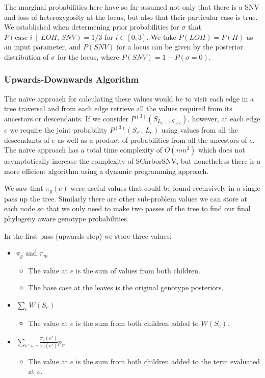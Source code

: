 \documentclass[../../main.tex]{subfiles}
\begin{document}
The marginal probabilities here have so far assumed not only that there is a SNV and loss of heterozygosity at the locus, but also that their particular case is true.
We established when determening prior probabilities for $\sigma$ that $P(\text{case }i\,\mid\,LOH,\,SNV) = 1/3$ for $i\in[0,3]$.
We take $P(LOH) = P(H)$ as an input parameter, and $P(SNV)$ for a locus can be given by the posterior distribution of $\sigma$ for the locus, where $P(SNV) = 1-P(\sigma=0)$.

\subsubsection*{Upwards-Downwards Algorithm}
The na\"ive approach for calculating these values would be to visit each edge in a tree traversal and from each edge retrieve all the values required from its ancestors or descendants.
If we consider $P^{(3)}(S_{L_e\,\mid\neg S_{\prec e}})$, however, at each edge $e$ we require the joint probability $P^{(3)}(S_{e'},\,L_e)$ using values from all the descendants of $e$ as well as a product of probabilities from all the ancestors of $e$.
The na\"ive approach has a total time complexity of $O(nm^2)$ which does not asymptotically increase the complexity of SCarborSNV, but nonetheless there is a more efficient algorithm using a dynamic programming approach.

We saw that $\pi_g(e)$ were useful values that could be found recursively in a single pass up the tree.
Similarly there are other sub-problem values we can store at each node so that we only need to make two passes of the tree to find our final phylogeny aware genotype probabilities.

In the first pass (upwards step) we store three values:
\begin{itemize}
    \item $\pi_g$ and $\pi_m$
        \begin{itemize}
            \item The value at $e$ is the sum of values from both children.
            \item The base case at the leaves is the original genotype posteriors.
        \end{itemize}
    \item $\sum_e W(S_e)$
        \begin{itemize}
            \item The value at $e$ is the sum from both children added to $W(S_e)$.
        \end{itemize}
    \item $\sum_{e'\succ e} \frac{\pi_2(e')}{\pi_0(e')}\overline{p}_{e'}$
        \begin{itemize}
            \item The value at $e$ is the sum from both children added to the term evaluated at $e$.
        \end{itemize}
\end{itemize}
\end{document}
